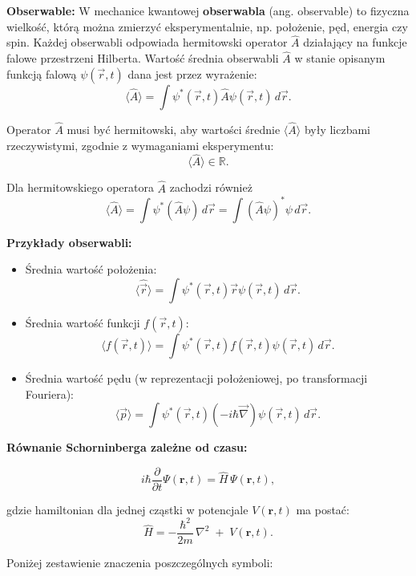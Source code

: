 \begin{itemize}
\begin{itemize}
\textbf{Obserwable:}
W mechanice kwantowej \textbf{obserwabla} (ang. observable) to fizyczna wielkość, którą można zmierzyć eksperymentalnie, np. położenie, pęd, energia czy spin. Każdej obserwabli odpowiada hermitowski operator $\hat{A}$ działający na funkcje falowe przestrzeni Hilberta. Wartość średnia obserwabli $\hat{A}$ w stanie opisanym funkcją falową $\psi(\vec{r}, t)$ dana jest przez wyrażenie:
$$
\langle \hat{A} \rangle = \int \psi^*(\vec{r}, t) \hat{A} \psi(\vec{r}, t) \, d\vec{r}.
$$

Operator $\hat{A}$ musi być hermitowski, aby wartości średnie $\langle \hat{A} \rangle$ były liczbami rzeczywistymi, zgodnie z wymaganiami eksperymentu:
$$
\langle \hat{A} \rangle \in \mathbb{R}.
$$

Dla hermitowskiego operatora $\hat{A}$ zachodzi również
$$
\langle \hat{A} \rangle = \int \psi^* (\hat{A} \psi) \, d\vec{r} = \int (\hat{A} \psi)^* \psi \, d\vec{r}.
$$

\textbf{Przykłady obserwabli:}

\begin{itemize}
    \item Średnia wartość położenia:
    $$
    \langle \hat{\vec{r}} \rangle = \int \psi^*(\vec{r}, t) \vec{r} \psi(\vec{r}, t) \, d\vec{r}.
    $$

    \item Średnia wartość funkcji $f(\vec{r}, t)$:
    $$
    \langle f(\vec{r}, t) \rangle = \int \psi^*(\vec{r}, t) f(\vec{r}, t) \psi(\vec{r}, t) \, d\vec{r}.
    $$

    \item Średnia wartość pędu (w reprezentacji położeniowej, po transformacji Fouriera):
    $$
    \langle \vec{p} \rangle = \int \psi^*(\vec{r}, t) \left( -i\hbar \vec{\nabla} \right) \psi(\vec{r}, t) \, d\vec{r}.
    $$
\end{itemize}
\textbf{Równanie Schorninberga zależne od czasu:}

\begin{equation}
  i \hbar \frac{\partial}{\partial t} \Psi(\mathbf{r},t)
  = \hat{H}\,\Psi(\mathbf{r},t),
\end{equation}

gdzie hamiltonian dla jednej cząstki w potencjale \(V(\mathbf{r},t)\) ma postać:
\begin{equation}
  \hat{H}
  = -\frac{\hbar^2}{2m} \,\nabla^2 \;+\; V(\mathbf{r},t).
\end{equation}

\bigskip
Poniżej zestawienie znaczenia poszczególnych symboli:


\end{itemize}
\end{itemize}
